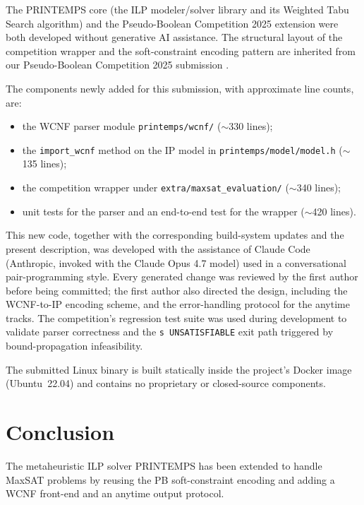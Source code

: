 \documentclass[conference]{IEEEtran}
\begin{document}
The PRINTEMPS core (the ILP modeler/solver library and its Weighted Tabu Search algorithm) and the Pseudo-Boolean Competition 2025 extension were both developed without generative AI assistance.
The structural layout of the competition wrapper and the soft-constraint encoding pattern are inherited from our Pseudo-Boolean Competition 2025 submission \cite{printemps-pb25}.

The components newly added for this submission, with approximate line counts, are:
\begin{itemize}
\item the WCNF parser module \texttt{printemps/wcnf/} ($\sim$330 lines);
\item the \texttt{import\_wcnf} method on the IP model in \texttt{printemps/model/model.h} ($\sim$135 lines);
\item the competition wrapper under \texttt{extra/maxsat\_evaluation/} ($\sim$340 lines);
\item unit tests for the parser and an end-to-end test for the wrapper ($\sim$420 lines).
\end{itemize}
This new code, together with the corresponding build-system updates and the present description, was developed with the assistance of Claude Code \cite{claude-code} (Anthropic, invoked with the Claude Opus 4.7 model) used in a conversational pair-programming style. Every generated change was reviewed by the first author before being committed; the first author also directed the design, including the WCNF-to-IP encoding scheme, and the error-handling protocol for the anytime tracks. The competition's regression test suite \cite{mse26} was used during development to validate parser correctness and the \texttt{s UNSATISFIABLE} exit path triggered by bound-propagation infeasibility.

The submitted Linux binary is built statically inside the project's Docker image (Ubuntu~22.04) and contains no proprietary or closed-source components.

\section{Conclusion}
The metaheuristic ILP solver PRINTEMPS has been extended to handle MaxSAT problems by reusing the PB soft-constraint encoding and adding a WCNF front-end and an anytime output protocol.
\end{document}
